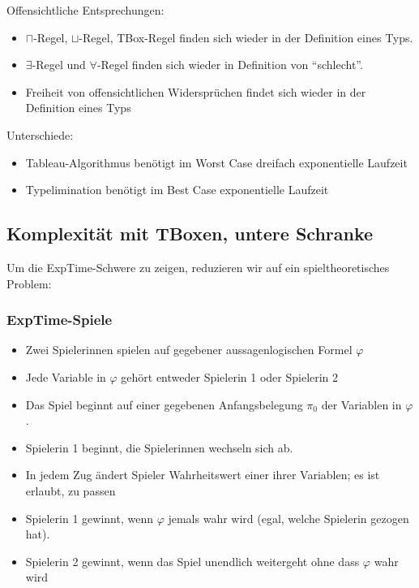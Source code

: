 Offensichtliche Entsprechungen:

\begin{itemize}
  \item $\sqcap$-Regel, $\sqcup$-Regel, TBox-Regel finden sich wieder in der Definition eines Typs.
  \item $\exists$-Regel und $\forall$-Regel finden sich wieder in Definition von \enquote{schlecht}.
  \item Freiheit von offensichtlichen Widersprüchen findet sich wieder in der Definition eines Typs
\end{itemize}

Unterschiede:

\begin{itemize}
  \item Tableau-Algorithmus benötigt im Worst Case dreifach exponentielle Laufzeit
  \item Typelimination benötigt im Best Case exponentielle Laufzeit
\end{itemize}

\subsection{Komplexität mit TBoxen, untere Schranke}\label{komplexituxe4t-mit-tboxen-untere-schranke}

Um die ExpTime-Schwere zu zeigen, reduzieren wir auf ein spieltheoretisches Problem:

\subsubsection{ExpTime-Spiele}\label{exptime-spiele}

\begin{itemize}
\item Zwei Spielerinnen spielen auf gegebener aussagenlogischen Formel $\varphi$
\item Jede Variable in $\varphi$ gehört entweder Spielerin 1 oder Spielerin 2
\item Das Spiel beginnt auf einer gegebenen Anfangsbelegung $\pi_0$ der Variablen in $\varphi$.
\item Spielerin 1 beginnt, die Spielerinnen wechseln sich ab.
\item In jedem Zug ändert Spieler Wahrheitswert einer ihrer Variablen; es ist erlaubt, zu passen
\item Spielerin 1 gewinnt, wenn $\varphi$ jemals wahr wird (egal, welche Spielerin gezogen hat).
\item Spielerin 2 gewinnt, wenn das Spiel unendlich weitergeht ohne dass $\varphi$ wahr wird
\end{itemize}

